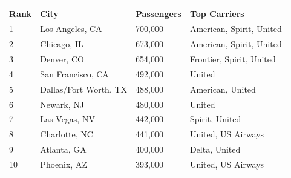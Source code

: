 \documentclass{article}
\begin{document}
\begin{tabular}{llll}
\toprule
Rank & City & Passengers & Top Carriers \\
\midrule
1 & Los Angeles, CA & 700,000 & American, Spirit, United \\
2 & Chicago, IL & 673,000 & American, Spirit, United \\
3 & Denver, CO & 654,000 & Frontier, Spirit, United \\
4 & San Francisco, CA & 492,000 & United \\
5 & Dallas/Fort Worth, TX & 488,000 & American, United \\
6 & Newark, NJ & 480,000 & United \\
7 & Las Vegas, NV & 442,000 & Spirit, United \\
8 & Charlotte, NC & 441,000 & United, US Airways \\
9 & Atlanta, GA & 400,000 & Delta, United \\
10 & Phoenix, AZ & 393,000 & United, US Airways \\
\bottomrule
\end{tabular}
\end{document}
